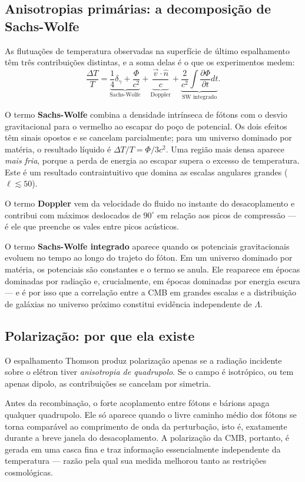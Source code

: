 \documentclass[11pt,a4paper]{article}
\begin{document}
\subsection*{Anisotropias primárias: a decomposição de Sachs-Wolfe}

As flutuações de temperatura observadas na superfície de último espalhamento têm três contribuições distintas, e a soma delas é o que os experimentos medem:
\[
\frac{\Delta T}{T}=\underbrace{\frac{1}{4}\delta_\gamma+\frac{\Phi}{c^{2}}}_{\text{Sachs-Wolfe}}
+\underbrace{\frac{\vec{v}\cdot\hat{n}}{c}}_{\text{Doppler}}
+\underbrace{\frac{2}{c^{2}}\int\frac{\partial\Phi}{\partial t}dt}_{\text{SW integrado}}.
\]

O termo \textbf{Sachs-Wolfe} combina a densidade intrínseca de fótons com o desvio gravitacional para o vermelho ao escapar do poço de potencial. Os dois efeitos têm sinais opostos e se cancelam parcialmente; para um universo dominado por matéria, o resultado líquido é $\Delta T/T=\Phi/3c^{2}$. Uma região mais densa aparece \emph{mais fria}, porque a perda de energia ao escapar supera o excesso de temperatura. Este é um resultado contraintuitivo que domina as escalas angulares grandes ($\ell\lesssim50$).

O termo \textbf{Doppler} vem da velocidade do fluido no instante do desacoplamento e contribui com máximos deslocados de $90^\circ$ em relação aos picos de compressão --- é ele que preenche os vales entre picos acústicos.

O termo \textbf{Sachs-Wolfe integrado} aparece quando os potenciais gravitacionais evoluem no tempo ao longo do trajeto do fóton. Em um universo dominado por matéria, os potenciais são constantes e o termo se anula. Ele reaparece em épocas dominadas por radiação e, crucialmente, em épocas dominadas por energia escura --- e é por isso que a correlação entre a CMB em grandes escalas e a distribuição de galáxias no universo próximo constitui evidência independente de $\Lambda$.

\subsection*{Polarização: por que ela existe}

O espalhamento Thomson produz polarização apenas se a radiação incidente sobre o elétron tiver \emph{anisotropia de quadrupolo}. Se o campo é isotrópico, ou tem apenas dipolo, as contribuições se cancelam por simetria.

Antes da recombinação, o forte acoplamento entre fótons e bárions apaga qualquer quadrupolo. Ele só aparece quando o livre caminho médio dos fótons se torna comparável ao comprimento de onda da perturbação, isto é, exatamente durante a breve janela do desacoplamento. A polarização da CMB, portanto, é gerada em uma casca fina e traz informação essencialmente independente da temperatura --- razão pela qual sua medida melhorou tanto as restrições cosmológicas.
\end{document}
